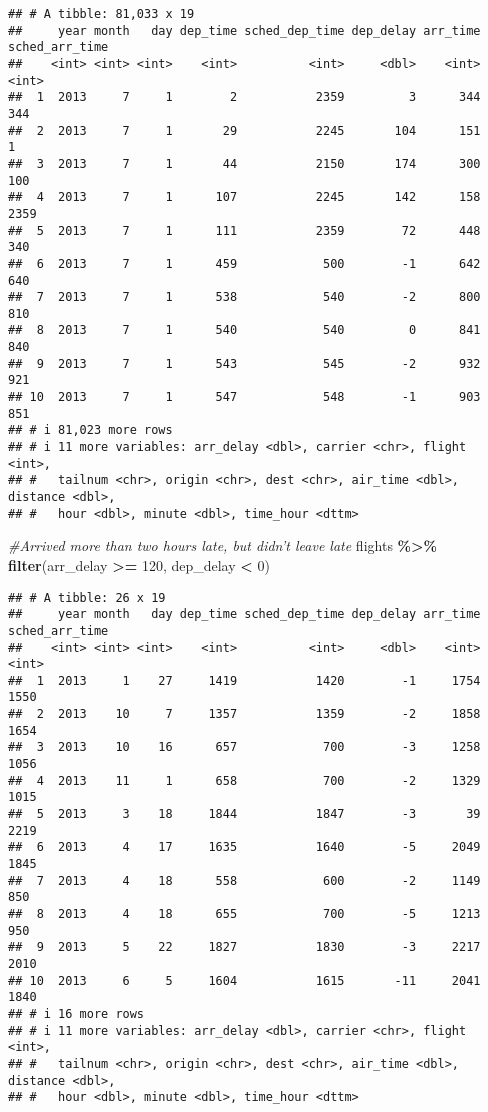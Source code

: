 \documentclass[
]{article}
\newenvironment{Shaded}{\begin{snugshade}}{\end{snugshade}}
\newcommand{\CommentTok}[1]{\textcolor[rgb]{0.56,0.35,0.01}{\textit{#1}}}
\newcommand{\DecValTok}[1]{\textcolor[rgb]{0.00,0.00,0.81}{#1}}
\newcommand{\FunctionTok}[1]{\textcolor[rgb]{0.13,0.29,0.53}{\textbf{#1}}}
\newcommand{\NormalTok}[1]{#1}
\newcommand{\SpecialCharTok}[1]{\textcolor[rgb]{0.81,0.36,0.00}{\textbf{#1}}}
\begin{document}
\begin{verbatim}
## # A tibble: 81,033 x 19
##     year month   day dep_time sched_dep_time dep_delay arr_time sched_arr_time
##    <int> <int> <int>    <int>          <int>     <dbl>    <int>          <int>
##  1  2013     7     1        2           2359         3      344            344
##  2  2013     7     1       29           2245       104      151              1
##  3  2013     7     1       44           2150       174      300            100
##  4  2013     7     1      107           2245       142      158           2359
##  5  2013     7     1      111           2359        72      448            340
##  6  2013     7     1      459            500        -1      642            640
##  7  2013     7     1      538            540        -2      800            810
##  8  2013     7     1      540            540         0      841            840
##  9  2013     7     1      543            545        -2      932            921
## 10  2013     7     1      547            548        -1      903            851
## # i 81,023 more rows
## # i 11 more variables: arr_delay <dbl>, carrier <chr>, flight <int>,
## #   tailnum <chr>, origin <chr>, dest <chr>, air_time <dbl>, distance <dbl>,
## #   hour <dbl>, minute <dbl>, time_hour <dttm>
\end{verbatim}

\begin{Shaded}
\begin{Highlighting}[]
  \CommentTok{\#Arrived more than two hours late, but didn’t leave late}
\NormalTok{  flights }\SpecialCharTok{\%\textgreater{}\%} \FunctionTok{filter}\NormalTok{(arr\_delay }\SpecialCharTok{\textgreater{}=} \DecValTok{120}\NormalTok{, dep\_delay }\SpecialCharTok{\textless{}} \DecValTok{0}\NormalTok{)}
\end{Highlighting}
\end{Shaded}

\begin{verbatim}
## # A tibble: 26 x 19
##     year month   day dep_time sched_dep_time dep_delay arr_time sched_arr_time
##    <int> <int> <int>    <int>          <int>     <dbl>    <int>          <int>
##  1  2013     1    27     1419           1420        -1     1754           1550
##  2  2013    10     7     1357           1359        -2     1858           1654
##  3  2013    10    16      657            700        -3     1258           1056
##  4  2013    11     1      658            700        -2     1329           1015
##  5  2013     3    18     1844           1847        -3       39           2219
##  6  2013     4    17     1635           1640        -5     2049           1845
##  7  2013     4    18      558            600        -2     1149            850
##  8  2013     4    18      655            700        -5     1213            950
##  9  2013     5    22     1827           1830        -3     2217           2010
## 10  2013     6     5     1604           1615       -11     2041           1840
## # i 16 more rows
## # i 11 more variables: arr_delay <dbl>, carrier <chr>, flight <int>,
## #   tailnum <chr>, origin <chr>, dest <chr>, air_time <dbl>, distance <dbl>,
## #   hour <dbl>, minute <dbl>, time_hour <dttm>
\end{verbatim}
\end{document}
